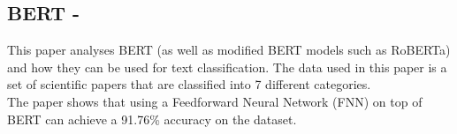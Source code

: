 \documentclass[a4paper,fleqn,10pt]{article}
\begin{document}


\subsection{BERT - \cite{bertmodelling}}
This paper analyses BERT (as well as modified BERT models such as RoBERTa) and how they can be used for text classification.
The data used in this paper is a set of scientific papers that are classified into 7 different categories.\\

The paper shows that using a Feedforward Neural Network (FNN) on top of BERT can achieve a 91.76\% accuracy on the dataset.
\end{document}
